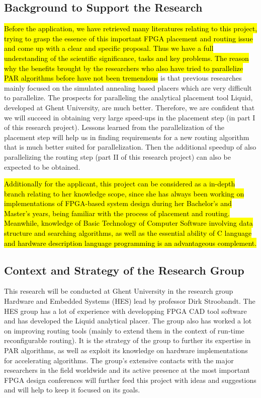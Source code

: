 \documentclass[a4paper,oneside,12pt]{article}
\begin{document}

\subsection{Background to Support the Research}

\hl{Before the application, we have retrieved many literatures relating to this project, trying to grasp the essence of this important FPGA placement and routing issue and come up with a clear and specific proposal. Thus we have a full understanding of the scientific significance, tasks and key problems. The reason why the benefits brought by the researchers who also have tried to parallelize PAR algorithms before have not been tremendous} is that previous researches mainly focused on the simulated annealing based placers which are very difficult to parallelize. The prospects for paralleling the analytical placement tool {\sc Liquid}, developed at Ghent University, are much better. Therefore, we are confident that we will succeed in obtaining very large speed-ups in the placement step (in part I of this research project). Lessons learned from the parallelization of the placement step will help us in finding requirements for a new routing algorithm that is much better suited for parallelization. Then the additional speedup of also parallelizing the routing step (part II of this research project) can also be expected to be obtained.

\hl{Additionally for the applicant, this project can be considered as a in-depth branch relating to her knowledge scope, since she has always been working on implementations of FPGA-based system design during her Bachelor's and Master's years, being familiar with the process of placement and routing. Meanwhile, knowledge of Basic Technology of Computer Software involving data structure and searching algorithms, as well as the essential ability of C language and hardware description language programming is an advantageous complement.}

\subsection{Context and Strategy of the Research Group}\label{context}
This research will be conducted at Ghent University in the research group Hardware and Embedded Systems (HES) lead by professor Dirk Stroobandt. The HES group has a lot of experience with developping FPGA CAD tool software and has developed the {\sc Liquid} analytical placer. The group also has worked a lot on improving routing tools (mainly to extend them in the context of run-time reconfigurable routing). It is the strategy of the group to further its expertise in PAR algorithms, as well as exploit its knowledge on hardware implementations for accelerating algorithms. The group's extensive contacts with the major researchers in the field worldwide and its active presence at the most important FPGA design conferences will further feed this project with ideas and suggestions and will help to keep it focused on its goals.
\end{document}
